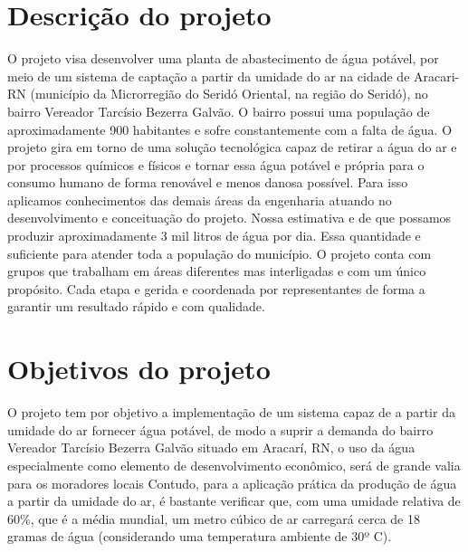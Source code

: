 \documentclass[12pt,openright,oneside,a4paper,brazil]{abntex2}
\begin{document}
  \section{Descrição do projeto}
O projeto visa desenvolver uma planta de abastecimento de água potável, por meio de um sistema de captação a partir da umidade do ar na cidade de Aracari-RN (município da Microrregião do Seridó Oriental, na região do Seridó), no bairro Vereador Tarcísio Bezerra Galvão. O bairro possui uma população de aproximadamente 900 habitantes e sofre constantemente com a falta de água. 
O projeto gira em torno de uma solução tecnológica  capaz de retirar a água do ar e por processos químicos e físicos e tornar essa água potável e própria para o consumo humano de forma renovável e menos danosa possível. Para isso aplicamos conhecimentos das demais áreas da engenharia atuando no desenvolvimento e conceituação do projeto. Nossa estimativa e de que possamos produzir aproximadamente 3 mil litros de água por dia. Essa quantidade e suficiente para atender toda a população do município. 
O projeto conta com grupos que trabalham em áreas diferentes mas interligadas e com um único propósito. Cada etapa e gerida e coordenada por representantes de forma a garantir um resultado rápido e com qualidade.


\section{Objetivos do projeto}
  O projeto tem por objetivo a implementação de um sistema capaz de a partir da  umidade do ar fornecer água potável, de modo a suprir a demanda do bairro Vereador Tarcísio Bezerra Galvão situado em Aracarí, RN, o  uso da água especialmente como elemento de desenvolvimento econômico, será de grande valia para os moradores locais 
Contudo, para a aplicação prática da produção de água a partir da umidade do ar, é bastante verificar que, com uma umidade relativa de 60\%, que é a média mundial, um metro cúbico de ar carregará cerca de 18 gramas de água (considerando uma temperatura ambiente de 30º C). 
\end{document}
